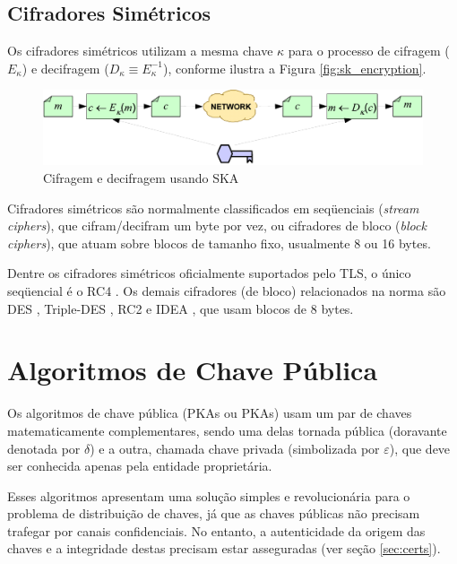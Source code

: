 \subsection{Cifradores Simétricos}

Os cifradores simétricos utilizam a mesma chave $\kappa$ para o processo de cifragem ($E_\kappa$) 
e decifragem ($D_\kappa \equiv E_\kappa^{-1}$), conforme ilustra a Figura \vref{fig:sk_encryption}.

	\begin{figure}[htbp]
		\centering
			\includegraphics[scale=0.7]{fig/sk_cipher}
		\caption{Cifragem e decifragem usando SKA}
		\label{fig:sk_encryption}
	\end{figure}

Cifradores simétricos são normalmente classificados em seqüenciais
(\emph{stream ciphers}), que cifram/decifram um byte por vez, ou cifradores de
bloco (\emph{block ciphers}), que atuam sobre blocos de tamanho fixo,
usualmente 8 ou 16 bytes.

Dentre os cifradores simétricos oficialmente suportados pelo TLS, o único 
seqüencial é o RC4 \cite{rfc_rc4}. Os demais cifradores (de bloco) relacionados na norma são 
DES \cite{fips_des}, Triple-DES \cite{ansi_3des}, RC2 \cite{rfc_rc2} e IDEA \cite{idea}, que usam blocos de 8 bytes.

\section{Algoritmos de Chave Pública}
\label{sec:pk}

Os algoritmos de chave pública (\aclp{PKA} ou \acsp{PKA}) usam um par de chaves
matematicamente complementares, sendo uma delas tornada pública (doravante denotada por $\delta$) 
e a outra, chamada chave privada (simbolizada por $\varepsilon$), que deve ser conhecida apenas pela entidade
proprietária.

Esses algoritmos apresentam uma solução simples e revolucionária para o problema de distribuição de chaves, 
já que as chaves públicas não precisam trafegar por canais confidenciais. No entanto, a autenticidade da
origem das chaves e a integridade destas precisam estar asseguradas (ver seção \ref{sec:certs}).

